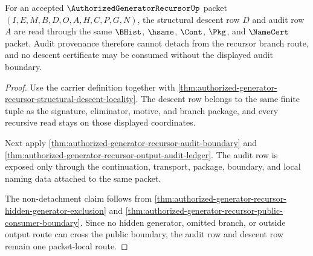 \begin{theorem}
\label{thm:authorized-generator-recursor-audit-descent-row}
For an accepted $\AuthorizedGeneratorRecursorUp$ packet
$(I,E,M,B,D,O,A,H,C,P,G,N)$, the structural descent row $D$ and audit row $A$
are read through the same $\BHist$, $\hsame$, $\Cont$, $\Pkg$, and
$\NameCert$ packet. Audit provenance therefore cannot detach from the recursor
branch route, and no descent certificate may be consumed without the displayed
audit boundary.
\end{theorem}
\begin{proof}
Use the carrier definition together with
\autoref{thm:authorized-generator-recursor-structural-descent-locality}. The
descent row belongs to the same finite tuple as the signature, eliminator,
motive, and branch package, and every recursive read stays on those displayed
coordinates.

Next apply \autoref{thm:authorized-generator-recursor-audit-boundary} and
\autoref{thm:authorized-generator-recursor-output-audit-ledger}. The audit row
is exposed only through the continuation, transport, package, boundary, and
local naming data attached to the same packet.

The non-detachment claim follows from
\autoref{thm:authorized-generator-recursor-hidden-generator-exclusion} and
\autoref{thm:authorized-generator-recursor-public-consumer-boundary}. Since no
hidden generator, omitted branch, or outside output route can cross the public
boundary, the audit row and descent row remain one packet-local route.
\end{proof}

